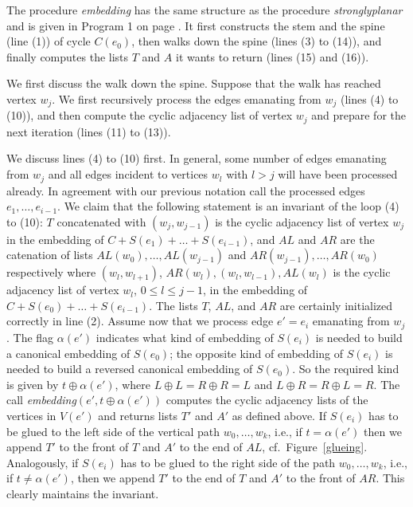 

The procedure {\em embedding} has the same structure as the procedure
{\em stronglyplanar} and is given in Program 1 on page \pageref{program}.
It first constructs the stem and the spine (line (1)) of cycle $C(e_0)$,
then walks down the spine (lines (3) to (14)), and finally computes
the lists $T$ and $A$ it wants to return (lines (15) and (16)).

We first discuss the walk down the spine.
Suppose that the walk has reached vertex $w_j$.
We first recursively process the edges emanating from $w_j$
(lines (4) to (10)), and then compute the cyclic adjacency list of vertex
$w_j$ and prepare for the next iteration (lines (11) to (13)).

We discuss lines (4) to (10) first.
In general, some number of edges emanating from $w_j$ and all edges
incident to vertices $w_l$ with $l>j$ will have been processed already.
In agreement with our previous notation call the processed edges
$e_1,\ldots ,e_{i-1}$.
We claim that the following statement is an invariant of the loop (4) to (10):
$T$ concatenated with $(w_j,w_{j-1})$ is the cyclic adjacency list of
vertex $w_j$ in the embedding of $C+S(e_1)+\ldots +S(e_{i-1})$, and
$AL$ and $AR$ are the catenation of lists $AL(w_0),\ldots ,AL(w_{j-1})$
and $AR(w_{j-1}),\ldots ,AR(w_0)$ respectively where $(w_l,w_{l+1})$,
$AR(w_l), (w_l,w_{l-1}), AL(w_l)$ is the cyclic adjacency
list of vertex $w_l$, $0\leq l\leq j-1$, in the embedding of
$C+S(e_0)+\ldots +S(e_{i-1})$.
The lists $T$, $AL$, and $AR$ are certainly initialized correctly in
line (2).
Assume now that we process edge $e'=e_i$ emanating from $w_j$.
The flag $\alpha(e')$ indicates what kind of embedding of $S(e_i)$ is
needed to build a canonical embedding of $S(e_0)$; the opposite kind of
embedding of $S(e_i)$ is needed to build a reversed canonical embedding
of $S(e_0)$.
So the required kind is given by $t\oplus\alpha(e')$, where
$L\oplus L=R\oplus R=L$ and $L\oplus R=R\oplus L=R$.
The call {\em embedding}$(e',t\oplus\alpha(e'))$ computes the cyclic
adjacency lists of the vertices in $V(e')$ and returns lists $T'$ and
$A'$ as defined above.
If $S(e_i)$ has to be glued to the left side of the vertical path
$w_0,\ldots ,w_k$, i.e., if  $t=\alpha(e')$ then we append $T'$ to the front of
$T$ and $A'$ to
the end of $AL$, cf.\ Figure~\ref{glueing}.
Analogously, if $S(e_i)$ has to be glued to the right side of the
path $w_0,\ldots ,w_k$, i.e., if $t\not=\alpha(e')$, then we append $T'$
to the end of $T$ and $A'$ to the front of $AR$.
This clearly maintains the invariant.

